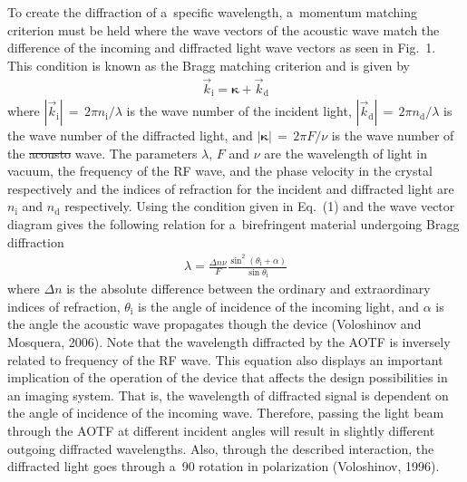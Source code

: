 \documentclass[amtd, online, hvmath]{copernicus}
\providecommand{\DIFadd}[1]{{\protect\color{blue}\uwave{#1}}} %
\providecommand{\DIFdel}[1]{{\protect\color{red}\sout{#1}}}                      %
\providecommand{\DIFaddbegin}{} %
\providecommand{\DIFaddend}{} %
\providecommand{\DIFdelbegin}{} %
\providecommand{\DIFdelend}{} %
\begin{document}
To create the diffraction of a~specific wavelength, a~momentum matching
criterion must be held where the wave vectors of the acoustic wave match the
difference of the incoming and diffracted light wave vectors as seen in
Fig.~1. This condition is known as the Bragg matching criterion and is given
by
\begin{align}
\vec{k}_{\mathrm{i}}=\boldsymbol{\kappa} +\vec{k}_{\mathrm{d}}
\end{align}
where $\left| \vec{k}_{\mathrm{i}} \right|\,=\,2\pi
n_{\mathrm{i}}/\lambda$ is the wave number of the incident light,
$\left| \vec{k}_{\mathrm{d}} \right|\,=\,2\pi n_{\mathrm{d}}/\lambda$
is the wave number of the diffracted light, and $\left|
  \boldsymbol{\kappa} \right|\,=\,2\pi F/\nu$ is the wave number of
the \DIFdelbegin \DIFdel{acousto }\DIFdelend \DIFaddbegin \DIFadd{acoustic }\DIFaddend wave. The parameters $\lambda$, $F$ and $\nu$ are the
wavelength of light in vacuum, the frequency of the RF wave, and the
phase velocity in the crystal respectively and the indices of
refraction for the incident and diffracted light are $n_{\mathrm{i}}$
and $n_{\mathrm{d}}$ respectively. Using the condition given in
Eq.~(1) and the wave vector diagram gives the following relation for
a~birefringent material undergoing Bragg diffraction
\begin{align}
\lambda =\frac{\Delta n\nu} {F}\frac{\sin^{2}\left(\theta
_{\mathrm{i}}+\alpha \right)}{\sin \theta_{\mathrm{i}}}
\end{align}
where $\Delta n$ is the absolute difference between the
ordinary and extraordinary indices of refraction,
$\theta_{\mathrm{i}}$ is the angle of incidence of the incoming light,
and $\alpha$ is the angle the acoustic wave propagates though the
device (Voloshinov and Mosquera, 2006). Note that the wavelength
diffracted by the AOTF is inversely related to frequency of the RF
wave. This equation also displays an important implication of the
operation of the device that affects the design possibilities in an
imaging system. That is, the wavelength of diffracted signal is
dependent on the angle of incidence of the incoming wave. Therefore,
passing the light beam through the AOTF at different incident angles
will result in slightly different outgoing diffracted
wavelengths. Also, through the described interaction, the diffracted
light goes through a~90{\degree} rotation in polarization (Voloshinov,
1996).
\end{document}
